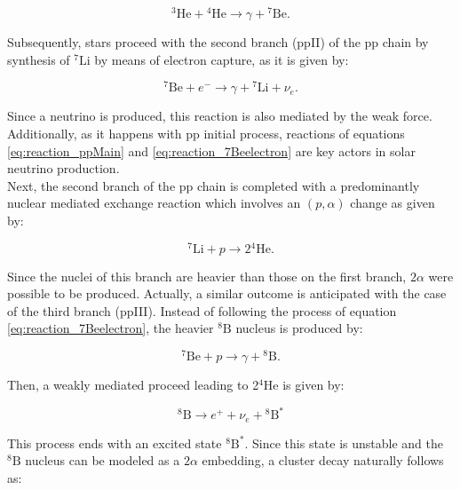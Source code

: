 \documentclass[openany]{book}
\begin{document}
\begin{equation}  \label{eq:reaction_3He4He}
	{}^{3}\mathrm{He} +{}^{4}\mathrm{He} \rightarrow \gamma +  \mathrm{{}^{7}Be} .
\end{equation}

Subsequently, stars proceed with the second branch (ppII)  of the pp chain by synthesis of $\mathrm{{}^{7}Li}$ by means of electron capture, as it is given by:

\begin{equation}  \label{eq:reaction_7Beelectron}
	{}^{7}\mathrm{Be} + e^{-} \rightarrow \gamma +  \mathrm{{}^{7}Li} + \nu_e.
\end{equation}

Since a neutrino is produced, this reaction is also mediated by the weak force. Additionally, as it happens with pp initial process, reactions of equations \ref{eq:reaction_ppMain} and \ref{eq:reaction_7Beelectron} are key actors in solar neutrino production.  \\

Next, the second branch of the pp chain is completed with a predominantly nuclear mediated exchange reaction which involves an $(p, \alpha)$ change as given by: 

\begin{equation}  \label{eq:reaction_7Lialpha}
	{}^{7}\mathrm{Li} + p  \rightarrow 2\mathrm{{}^{4}He}.
\end{equation}

Since the nuclei of this branch are heavier than those on the first branch, $2\alpha$ were possible to be produced. Actually, a similar outcome is anticipated with the case of the third branch  (ppIII). Instead of following the process of equation \ref{eq:reaction_7Beelectron}, the heavier $\mathrm{{}^{8}B}$ nucleus is produced by:

\begin{equation}  \label{eq:reaction_7Bep}
		{}^{7}\mathrm{Be}  + p \rightarrow \gamma +  \mathrm{{}^{8}B} .
\end{equation}

Then, a weakly mediated proceed leading to 2$\mathrm{{}^4He}$ is given by: 

\begin{equation} \label{eq:reaction_8Bpositron}
	{}^{8}\mathrm{B} \rightarrow e^{+} + \nu_e + 	{}^{8}\mathrm{B^{*}}
\end{equation}

This process ends with an excited state ${}^{8}\mathrm{B^{*}}$. Since this state is unstable and the $\mathrm{{}^{8}B}$ nucleus can be modeled as a $2\alpha$ embedding, a cluster decay naturally follows as: 
\end{document}

